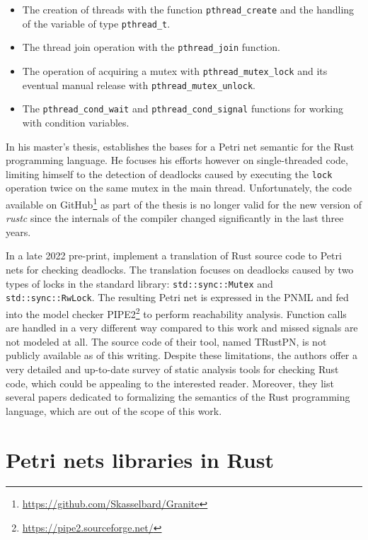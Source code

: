 \documentclass[../Thesis.tex]{subfiles}
\begin{document}
\begin{itemize}
    \item The creation of threads with the function \texttt{pthread\_create}
          and the handling of the variable of type \texttt{pthread\_t}.
    \item The thread join operation with the \texttt{pthread\_join} function.
    \item The operation of acquiring a mutex with \texttt{pthread\_mutex\_lock}
          and its eventual manual release with \texttt{pthread\_mutex\_unlock}.
    \item The \texttt{pthread\_cond\_wait} and \texttt{pthread\_cond\_signal} functions
          for working with condition variables.
\end{itemize}

In his master's thesis, \cite{meyer2020} establishes
the bases for a Petri net semantic for the Rust programming language.
He focuses his efforts however on single-threaded code,
limiting himself to the detection of deadlocks caused by
executing the \texttt{lock} operation twice on the same mutex in the main thread.
Unfortunately, the code available on GitHub\footnote{\url{https://github.com/Skasselbard/Granite}}
as part of the thesis is no longer valid for the new version of \emph{rustc}
since the internals of the compiler changed significantly in the last three years.

In a late 2022 pre-print, \cite{zhang2022deadlocks} implement a translation
of Rust source code to Petri nets for checking deadlocks.
The translation focuses on deadlocks caused by two types of locks
in the standard library: \texttt{std::sync::Mutex} and \texttt{std::sync::RwLock}.
The resulting Petri net is expressed in the \acrfull{PNML}
and fed into the model checker \acrfull{PIPE2}\footnote{\url{https://pipe2.sourceforge.net/}}
to perform reachability analysis.
Function calls are handled in a very different way compared to this work and
missed signals are not modeled at all.
The source code of their tool, named TRustPN, is not publicly available as of this writing.
Despite these limitations, the authors offer a very detailed and up-to-date survey
of static analysis tools for checking Rust code,
which could be appealing to the interested reader.
Moreover, they list several papers dedicated to
formalizing the semantics of the Rust programming language,
which are out of the scope of this work.

\section{Petri nets libraries in Rust}
\end{document}
